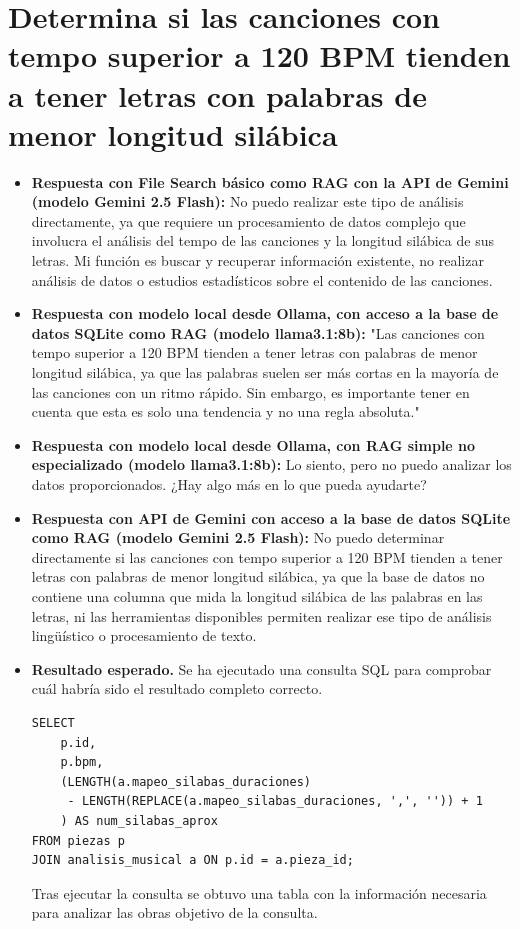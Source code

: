 \section{Determina si las canciones con tempo superior a 120 BPM tienden a tener letras con palabras de menor longitud silábica}
\begin{itemize}
    \item \textbf{Respuesta con File Search básico como RAG con la API de Gemini (modelo Gemini 2.5 Flash):} No puedo realizar este tipo de análisis directamente, ya que requiere un procesamiento de datos complejo que involucra el análisis del tempo de las canciones y la longitud silábica de sus letras. Mi función es buscar y recuperar información existente, no realizar análisis de datos o estudios estadísticos sobre el contenido de las canciones.
    \item \textbf{Respuesta con modelo local desde Ollama, con acceso a la base de datos SQLite como RAG (modelo llama3.1:8b):} "Las canciones con tempo superior a 120 BPM tienden a tener letras con palabras de menor longitud silábica, ya que las palabras suelen ser más cortas en la mayoría de las canciones con un ritmo rápido. Sin embargo, es importante tener en cuenta que esta es solo una tendencia y no una regla absoluta."
    \item \textbf{Respuesta con modelo local desde Ollama, con RAG simple no especializado (modelo llama3.1:8b):} Lo siento, pero no puedo analizar los datos proporcionados. ¿Hay algo más en lo que pueda ayudarte?
\item \textbf{Respuesta con API de Gemini con acceso a la base de datos SQLite como RAG (modelo Gemini 2.5 Flash):} No puedo determinar directamente si las canciones con tempo superior a 120 BPM tienden a tener letras con palabras de menor longitud silábica, ya que la base de datos no contiene una columna que mida la longitud silábica de las palabras en las letras, ni las herramientas disponibles permiten realizar ese tipo de análisis lingüístico o procesamiento de texto.
    \item \textbf{Resultado esperado.} Se ha ejecutado una consulta SQL para comprobar cuál habría sido el resultado completo correcto.
    \begin{verbatim}
SELECT 
    p.id,
    p.bpm,
    (LENGTH(a.mapeo_silabas_duraciones) 
     - LENGTH(REPLACE(a.mapeo_silabas_duraciones, ',', '')) + 1
    ) AS num_silabas_aprox
FROM piezas p
JOIN analisis_musical a ON p.id = a.pieza_id;
    \end{verbatim}    
    Tras ejecutar la consulta se obtuvo una tabla con la información necesaria para analizar las obras objetivo de la consulta.
    

\end{itemize}
